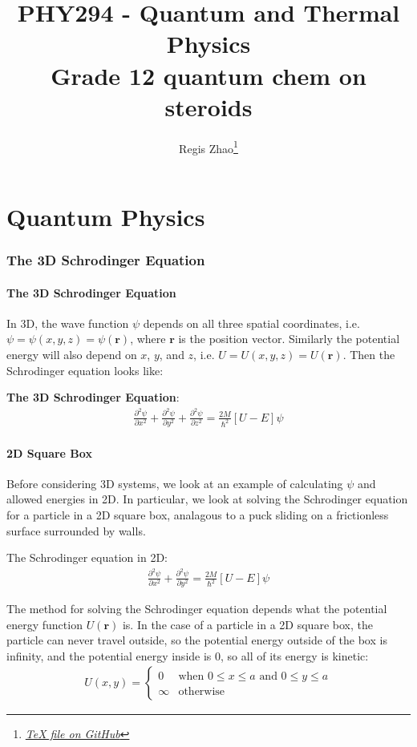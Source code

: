 \documentclass[10pt]{article}
\title{{\Huge PHY294 - Quantum and Thermal Physics}\\{\Large{Grade 12 quantum chem on steroids}}}
\author{Regis Zhao\footnote{\href{https://google.com/}{\textit{TeX file on GitHub}}}}
\affiliation{University of Toronto}
\begin{document}
\maketitle
\flushbottom
\newpage

\pagestyle{fancynotes}



\part{Quantum Physics}

\section{The 3D Schrodinger Equation}

\subsection{The 3D Schrodinger Equation}
In 3D, the wave function $\psi$ depends on all three spatial coordinates, i.e. $\psi = \psi(x, y, z) = \psi(\mathbf{r})$, where $\mathbf{r}$ is the position vector. Similarly the potential energy will also depend on $x$, $y$, and $z$, i.e. $U = U(x, y, z) = U(\mathbf{r})$. Then the Schrodinger equation looks like:
\begin{definition}
    \textbf{The 3D Schrodinger Equation}:
    \begin{align}
        \frac{\partial^2 \psi}{\partial x^2} + \frac{\partial^2 \psi}{\partial y^2} + \frac{\partial^2 \psi}{\partial z^2} = \frac{2M}{\hbar^2} [U - E] \psi
    \end{align}
\end{definition}

\subsection{2D Square Box}
Before considering 3D systems, we look at an example of calculating $\psi$ and allowed energies in 2D. In particular, we look at solving the Schrodinger equation for a particle in a 2D square box, analagous to a puck sliding on a frictionless surface surrounded by walls.

The Schrodinger equation in 2D:
\begin{align}
        \frac{\partial^2 \psi}{\partial x^2} + \frac{\partial^2 \psi}{\partial y^2}  = \frac{2M}{\hbar^2} [U - E] \psi
\end{align}

The method for solving the Schrodinger equation depends what the potential energy function $U(\mathbf{r})$ is. In the case of a particle in a 2D square box, the particle can never travel outside, so the potential energy outside of the box is infinity, and the potential energy inside is 0, so all of its energy is kinetic:
\begin{align}
    U(x,y) =
    \begin{cases}
        0 & \text{when $0 \leq x \leq a$ and $0 \leq y \leq a$} \\ 
        \infty & \text{otherwise}
    \end{cases}
\end{align}
\end{document}
